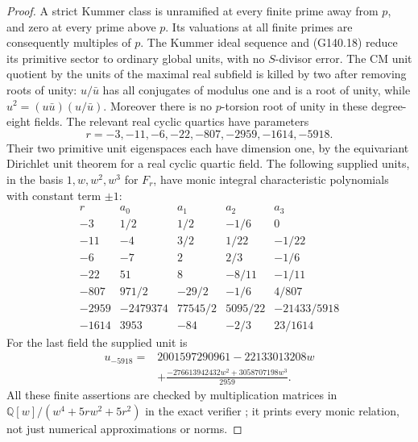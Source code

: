 \begin{proof}
A strict Kummer class is unramified at every finite prime away
from $p$, and zero at every prime above $p$.  Its valuations
at all finite primes are consequently multiples of $p$.
The Kummer ideal sequence and (G140.18) reduce its primitive
sector to ordinary global units, with no $S$-divisor error.
The CM unit quotient by the units of the maximal real subfield
is killed by two after removing roots of unity: $u/\bar u$ has
all conjugates of modulus one and is a root of unity, while
$u^2=(u\bar u)(u/\bar u)$.
Moreover
there is no $p$-torsion root of unity in these degree-eight fields.
The relevant real cyclic quartics have parameters
\[
             r=-3,-11,-6,-22,-807,-2959,-1614,-5918.
 \tag{G140.19}
\]
Their two primitive unit eigenspaces each have dimension one,
by the equivariant Dirichlet unit theorem for a real cyclic
quartic field.  The following supplied units, in the basis
$1,w,w^2,w^3$ for $F_r$, have monic integral characteristic
polynomials with constant term $\pm1$:
\[
\begin{array}{c|rrrr}
r&a_0&a_1&a_2&a_3\\\hline
-3&1/2&1/2&-1/6&0\\
-11&-4&3/2&1/22&-1/22\\
-6&-7&2&2/3&-1/6\\
-22&51&8&-8/11&-1/11\\
-807&971/2&-29/2&-1/6&4/807\\
-2959&-2479374&77545/2&5095/22&-21433/5918\\
-1614&3953&-84&-2/3&23/1614
\end{array} \tag{G140.20}
\]
For the last field the supplied unit is
\[
 \begin{aligned}
 u_{-5918}={}&2001597290961-22133013208w\\
 &+\frac{-276613942432w^2+3058707198w^3}{2959}.
 \end{aligned}
\]
All these finite assertions are checked by multiplication
matrices in $\mathbb Q[w]/(w^4+5rw^2+5r^2)$ in the exact
verifier ; it prints every monic
relation, not just numerical approximations or norms.


\end{proof}

